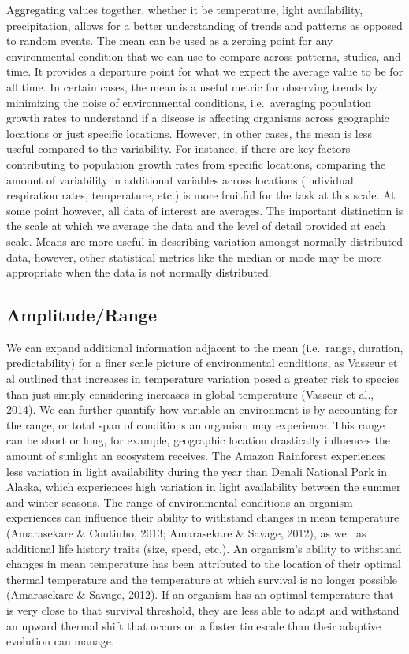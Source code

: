 \documentclass[12pt,twoside]{reedthesis}
\begin{document}
Aggregating values together, whether it be temperature, light availability, precipitation, allows for a better understanding of trends and patterns as opposed to random events. The mean can be used as a zeroing point for any environmental condition that we can use to compare across patterns, studies, and time. It provides a departure point for what we expect the average value to be for all time. In certain cases, the mean is a useful metric for observing trends by minimizing the noise of environmental conditions, i.e.~averaging population growth rates to understand if a disease is affecting organisms across geographic locations or just specific locations. However, in other cases, the mean is less useful compared to the variability. For instance, if there are key factors contributing to population growth rates from specific locations, comparing the amount of variability in additional variables across locations (individual respiration rates, temperature, etc.) is more fruitful for the task at this scale. At some point however, all data of interest are averages. The important distinction is the scale at which we average the data and the level of detail provided at each scale. Means are more useful in describing variation amongst normally distributed data, however, other statistical metrics like the median or mode may be more appropriate when the data is not normally distributed.

\hypertarget{amplituderange}{%
\subsection{Amplitude/Range}\label{amplituderange}}

We can expand additional information adjacent to the mean (i.e.~range, duration, predictability) for a finer scale picture of environmental conditions, as Vasseur et al outlined that increases in temperature variation posed a greater risk to species than just simply considering increases in global temperature (Vasseur et al., 2014). We can further quantify how variable an environment is by accounting for the range, or total span of conditions an organism may experience. This range can be short or long, for example, geographic location drastically influences the amount of sunlight an ecosystem receives. The Amazon Rainforest experiences less variation in light availability during the year than Denali National Park in Alaska, which experiences high variation in light availability between the summer and winter seasons. The range of environmental conditions an organism experiences can influence their ability to withstand changes in mean temperature (Amarasekare \& Coutinho, 2013; Amarasekare \& Savage, 2012), as well as additional life history traits (size, speed, etc.). An organism's ability to withstand changes in mean temperature has been attributed to the location of their optimal thermal temperature and the temperature at which survival is no longer possible (Amarasekare \& Savage, 2012). If an organism has an optimal temperature that is very close to that survival threshold, they are less able to adapt and withstand an upward thermal shift that occurs on a faster timescale than their adaptive evolution can manage.
\end{document}
